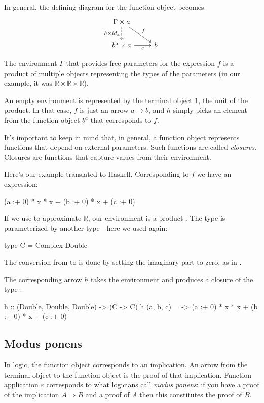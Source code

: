 \documentclass[DaoFP]{subfiles}
\begin{document}
In general, the defining diagram for the function object becomes:
\[
 \begin{tikzcd}
 \Gamma \times a
 \arrow[d, dashed, "{h \times id_a}"']
 \arrow[rd, "f"]
 \\
 b^a \times a
 \arrow[r, "\varepsilon"']
& b
 \end{tikzcd}
\]

The environment $\Gamma$ that provides free parameters for the expression $f$ is a product of multiple objects representing the types of the parameters (in our example, it was $\mathbb{R} \times \mathbb{R} \times \mathbb{R}$). 

An empty environment is represented by the terminal object $1$, the unit of the product. In that case, $f$ is just an arrow $a \to b$, and $h$ simply picks an element from the function object $b^a$ that corresponds to $f$. 

It's important to keep in mind that, in general, a function object represents functions that depend on external parameters. Such functions are called \emph{closures}. Closures are functions that capture values from their environment.

Here's our example translated to Haskell. Corresponding to $f$ we have an expression:
\begin{haskell}
(a :+ 0) * x * x + (b :+ 0) * x + (c :+ 0)
\end{haskell}
If we use  to approximate $\mathbb{R}$, our environment is a product . The type  is parameterized by another type---here we used  again:
\begin{haskell}
type C = Complex Double
\end{haskell}
The conversion from  to  is done by setting the imaginary part to zero, as in . 

The corresponding arrow $h$ takes the environment and produces a closure of the type :
\begin{haskell}
h :: (Double, Double, Double) -> (C -> C)
h (a, b, c) = \x -> (a :+ 0) * x * x + (b :+ 0) * x + (c :+ 0)
\end{haskell}

\subsection{Modus ponens}

In logic, the function object corresponds to an implication. An arrow from the terminal object to the function object is the proof of that implication. Function application $\varepsilon$ corresponds to what logicians call \emph{modus ponens}: if you have a proof of the implication $A \Rightarrow B$ and a proof of $A$ then this constitutes the proof of $B$.
\end{document}
